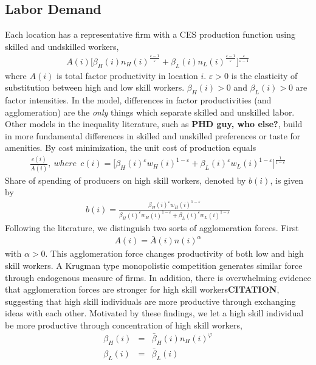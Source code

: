 \documentclass{article}
\begin{document}
\subsection{Labor Demand}
Each location has a representative firm with a CES production function using skilled and undskilled workers,
\begin{eqnarray}
	 A(i)\Big[ \beta_H(i) n_H(i)^{\frac{\varepsilon-1}{\varepsilon}} + \beta_L(i) n_L(i)^{\frac{\varepsilon-1}{\varepsilon}} \Big]^{\frac{\varepsilon}{\varepsilon-1}} \nonumber
\end{eqnarray}
where $A(i)$ is total factor productivity in location $i$. $\varepsilon>0$ is the elasticity of substitution between high and low skill workers. $\beta_H(i)>0$ and $\beta_L(i)>0$ are factor intensities. In the model, differences in factor productivities (and agglomeration) are the \textit{only} things which separate skilled and unskilled labor.  Other models in the inequality literature, such as \textbf{PHD guy, who else?}, build in more fundamental differences in skilled and unskilled preferences or taste for amenities.
By cost minimization, the unit cost of production equals
\begin{eqnarray}\label{eq:unit_cost}
	 \frac{c(i)}{A(i)} ,~where~~c(i)=\Big[ \beta_H(i)^{\varepsilon} w_H(i)^{1-\varepsilon} + \beta_L(i)^{\varepsilon} w_L(i)^{1-\varepsilon}\Big]^{\frac{1}{1-\varepsilon}}
\end{eqnarray}
Share of spending of producers on high skill workers, denoted by $b(i)$, is given by
\begin{eqnarray}\label{eq:input_share}
	b(i) = \frac{\beta_H(i)^{\varepsilon} w_H(i)^{1-\varepsilon}}{\beta_H(i)^{\varepsilon} w_H(i)^{1-\varepsilon} + \beta_L(i)^{\varepsilon} w_L(i)^{1-\varepsilon}}
\end{eqnarray}
Following the literature, we distinguish two sorts of agglomeration forces. First 
\begin{eqnarray}\label{eq:agglom_general}
A(i) = \bar{A}(i) n(i)^{\alpha}
\end{eqnarray}
with $\alpha>0$. This agglomeration force changes productivity of both low and high skill workers. A Krugman type monopolistic competition generates similar force through endogenous measure of firms. In addition, there is overwhelming evidence that agglomeration forces are stronger for high skill workers\textbf{CITATION}, suggesting that high skill individuals are more productive through exchanging ideas with each other. Motivated by these findings, we let a high skill individual be more productive through concentration of high skill workers,
\begin{eqnarray}\label{eq:agglom_specific}
	\beta_H(i) & = & \bar{\beta}_H(i) n_H(i)^{\varphi} \nonumber \\
	\beta_L(i) & = & \bar{\beta}_L(i)
\end{eqnarray}
\end{document}
